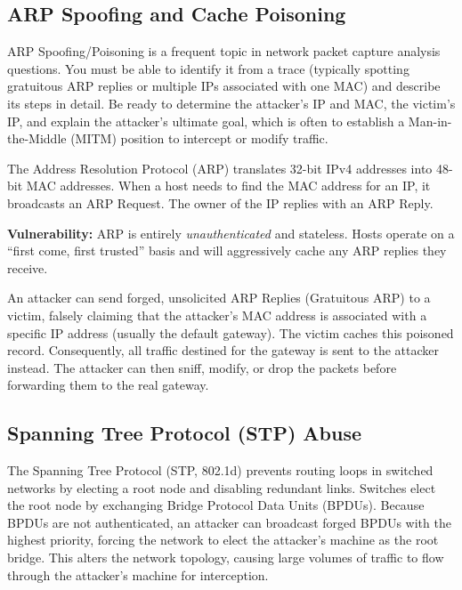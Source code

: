 \subsection{ARP Spoofing and Cache Poisoning}

\begin{tcolorbox}[colback=blue!5!white,colframe=blue!75!black,title=Exam Insight]
ARP Spoofing/Poisoning is a frequent topic in network packet capture analysis questions. You must be able to identify it from a trace (typically spotting gratuitous ARP replies or multiple IPs associated with one MAC) and describe its steps in detail. Be ready to determine the attacker's IP and MAC, the victim's IP, and explain the attacker's ultimate goal, which is often to establish a Man-in-the-Middle (MITM) position to intercept or modify traffic.
\end{tcolorbox}

The Address Resolution Protocol (ARP) translates 32-bit IPv4 addresses into 48-bit MAC addresses. When a host needs to find the MAC address for an IP, it broadcasts an ARP Request. The owner of the IP replies with an ARP Reply.

\textbf{Vulnerability:} ARP is entirely \textit{unauthenticated} and stateless. Hosts operate on a ``first come, first trusted'' basis and will aggressively cache any ARP replies they receive.

An attacker can send forged, unsolicited ARP Replies (Gratuitous ARP) to a victim, falsely claiming that the attacker's MAC address is associated with a specific IP address (usually the default gateway). The victim caches this poisoned record. Consequently, all traffic destined for the gateway is sent to the attacker instead. The attacker can then sniff, modify, or drop the packets before forwarding them to the real gateway.

\subsection{Spanning Tree Protocol (STP) Abuse}
The Spanning Tree Protocol (STP, 802.1d) prevents routing loops in switched networks by electing a root node and disabling redundant links. Switches elect the root node by exchanging Bridge Protocol Data Units (BPDUs). Because BPDUs are not authenticated, an attacker can broadcast forged BPDUs with the highest priority, forcing the network to elect the attacker's machine as the root bridge. This alters the network topology, causing large volumes of traffic to flow through the attacker's machine for interception.

